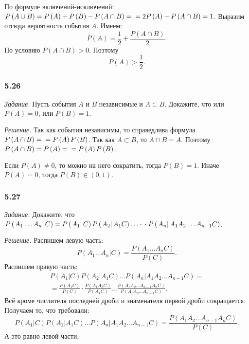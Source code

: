 По формуле включений-исключений:
$P \left( A \cup B \right) =
P \left( A \right) + P \left( B \right) - P \left( A \cap B \right) = \\
= 2P \left( A \right) - P \left( A \cap B \right) =
1$.
Выразим отсюда вероятность события $A$.
Имеем:
$$P \left( A \right) = \frac{1}{2} + \frac{P \left( A \cap B \right) }{2}.$$
По условию $P \left( A \cap B \right) > 0$.
Поэтому
$$P \left( A \right) >
\frac{1}{2}.$$

\subsubsection*{5.26}

\textit{Задание.} Пусть события $A$ и $B$ независимые и $A \subset B$.
Докажите, что или $P \left( A \right) = 0$, или $P \left( B \right) = 1$.

\textit{Решение.} Так как события независимы, то справедлива формула $P \left( A \cap B \right) =  \\ = P \left( A \right) P \left( B \right) $.
Так как $A \subset B$, то $A \cap B = A$.
Поэтому $P \left( A \cap B \right) = P \left( A \right) = \\ = P \left( A \right) P \left( B \right) $.

Если $P \left( A \right) \neq 0$, то можно на него сократить, тогда $P \left( B \right) = 1$.
Иначе $P \left( A \right) = 0$, тогда $P \left( B \right) \in \left( 0, 1 \right) $.

\subsubsection*{5.27}

\textit{Задание.} Докажите, что
$P \left( \left. A_1 \dotsc A_n \right| C \right) =
P \left( \left. A_1 \right| C \right)
P \left( \left. A_2 \right| A_1 C \right) \dotsc \cdot \\
\cdot P \left( \left. A_n \right| A_1 A_2 \dotsc A_{n-1} C \right) $.

\textit{Решение.} Распишем левую часть:
$$P \left( \left. A_1 \dotsc A_n \right| C \right) =
\frac{P \left( A_1 \dotsc A_n C \right) }{P \left( C \right) }.$$
Распишем правую часть:
\begin{equation*}
\begin{split}
P \left( \left. A_1 \right| C \right) P \left( \left. A_2 \right| A_1 C \right) \dotsc
P \left( \left. A_n \right| A_1 A_2 \dotsc A_{n-1} C \right) = \\
= \frac{P \left( A_1 C \right) }{P \left( C \right) } \cdot \frac{P \left( A_1 A_2 C \right) }{P \left( A_1 C \right) } \dotsc
\frac{P \left( A_1 A_2 \dotsc A_{n-1} A_n C \right) }{P \left( A_1 A_2 \dotsc A_{n-1} C \right) }.
\end{split}
\end{equation*}
Всё кроме числителя последней дроби и знаменателя первой дроби сокращается.
Получаем то, что требовали:
$$P \left( \left. A_1 \right| C \right) P \left( \left. A_2 \right| A_1 C \right) \dotsc
P \left( \left. A_n \right| A_1 A_2 \dotsc A_{n-1} C \right) =
\frac{P \left( A_1 A_2 \dotsc A_{n-1} A_n C \right) }{P \left( C \right) }.$$
А это равно левой части.
